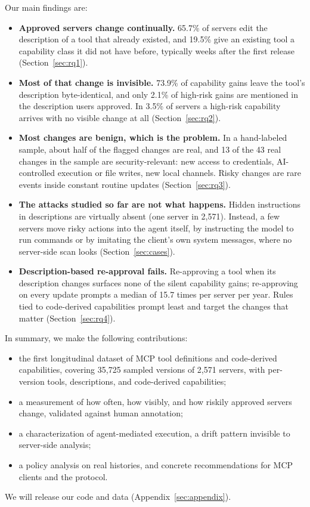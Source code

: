Our main findings are:
\begin{itemize}
\item \textbf{Approved servers change continually.} 65.7\% of servers edit the description of a tool that already existed, and 19.5\% give an existing tool a capability class it did not have before, typically weeks after the first release (Section~\ref{sec:rq1}).
\item \textbf{Most of that change is invisible.} 73.9\% of capability gains leave the tool's description byte-identical, and only 2.1\% of high-risk gains are mentioned in the description users approved. In 3.5\% of servers a high-risk capability arrives with no visible change at all (Section~\ref{sec:rq2}).
\item \textbf{Most changes are benign, which is the problem.} In a hand-labeled sample, about half of the flagged changes are real, and 13 of the 43 real changes in the sample are security-relevant: new access to credentials, AI-controlled execution or file writes, new local channels. Risky changes are rare events inside constant routine updates (Section~\ref{sec:rq3}).
\item \textbf{The attacks studied so far are not what happens.} Hidden instructions in descriptions are virtually absent (one server in 2,571). Instead, a few servers move risky actions into the agent itself, by instructing the model to run commands or by imitating the client's own system messages, where no server-side scan looks (Section~\ref{sec:cases}).
\item \textbf{Description-based re-approval fails.} Re-approving a tool when its description changes surfaces none of the silent capability gains; re-approving on every update prompts a median of 15.7 times per server per year. Rules tied to code-derived capabilities prompt least and target the changes that matter (Section~\ref{sec:rq4}).
\end{itemize}

In summary, we make the following contributions:
\begin{itemize}
\item the first longitudinal dataset of MCP tool definitions and code-derived capabilities, covering 35,725 sampled versions of 2,571 servers, with per-version tools, descriptions, and code-derived capabilities;
\item a measurement of how often, how visibly, and how riskily approved servers change, validated against human annotation;
\item a characterization of agent-mediated execution, a drift pattern invisible to server-side analysis;
\item a policy analysis on real histories, and concrete recommendations for MCP clients and the protocol.
\end{itemize}
We will release our code and data (Appendix~\ref{sec:appendix}).
